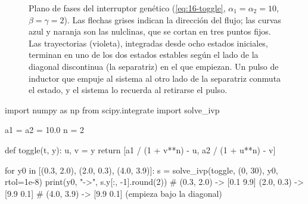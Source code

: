 \begin{figure}[t]
\centering
{}
\caption[Plano de fases del interruptor biestable]{Plano de fases del interruptor genético (\cref{eq:16-toggle}, $\alpha_1=\alpha_2=10$, $\beta=\gamma=2$). Las flechas grises indican la dirección del flujo; las curvas azul y naranja son las nulclinas, que se cortan en tres puntos fijos. Las trayectorias (violeta), integradas desde ocho estados iniciales, terminan en uno de los dos estados estables según el lado de la diagonal discontinua (la separatriz) en el que empiezan. Un pulso de inductor que empuje al sistema al otro lado de la separatriz conmuta el estado, y el sistema lo recuerda al retirarse el pulso.}
\label{fig:16-toggle}
\end{figure}

\begin{codigo}[interruptor.py]
import numpy as np
from scipy.integrate import solve_ivp

a1 = a2 = 10.0
n = 2

def toggle(t, y):
    u, v = y
    return [a1 / (1 + v**n) - u, a2 / (1 + u**n) - v]

for y0 in [(0.3, 2.0), (2.0, 0.3), (4.0, 3.9)]:
    s = solve_ivp(toggle, (0, 30), y0, rtol=1e-8)
    print(y0, "->", s.y[:, -1].round(2))
# (0.3, 2.0) -> [0.1 9.9]   (2.0, 0.3) -> [9.9 0.1]
# (4.0, 3.9) -> [9.9 0.1]   (empieza bajo la diagonal)
\end{codigo}

